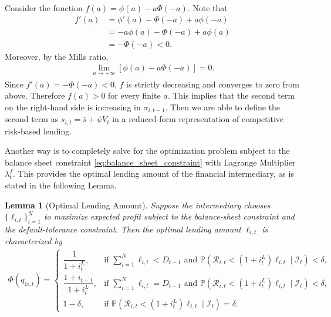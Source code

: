 \documentclass[12pt]{article}
\newtheorem{lemma}{Lemma}[section]
\numberwithin{equation}{section}
\begin{document}
\begin{appendix}
Consider the function $f(a) = \phi(a) - a\Phi(-a)$. Note that
\begin{align*}
    f'(a) &= \phi'(a) - \Phi(-a) + a\phi(-a)\\
    &= -a\phi(a) -\Phi(-a) + a\phi(a)\\
    &= -\Phi(-a) < 0.
\end{align*}
Moreover, by the Mills ratio,
\begin{align*}
    \lim_{a\to+\infty}
    \left[
    \phi(a)-a\Phi(-a)
    \right]
    =
    0.
\end{align*}
Since $f'(a)=-\Phi(-a)<0$, $f$ is strictly decreasing and converges to zero from above. Therefore $f(a)>0$ for every finite $a$. This implies that the second term on the right-hand side is increasing in $\sigma_{i,t-1}$. Then we are able to define the second term as $s_{i,t} = \bar{s} + \psi V_t$ in a reduced-form representation of competitive risk-based lending.

Another way is to completely solve for the optimization problem subject to the balance sheet constraint \eqref{eq:balance_sheet_constraint} with Lagrange Multiplier $\lambda^f_t$. This provides the optimal lending amount of the financial intermediary, as is stated in the following Lemma.
\begin{lemma}[Optimal Lending Amount]\label{lemma:optimal_lending_amount}
    Suppose the intermediary chooses $\{\ell_{i,t}\}_{i=1}^N$ to maximize expected profit subject to the balance-sheet constraint and the default-tolerance constraint. Then the optimal lending amount $\ell_{i,t}$ is characterized by
    \begin{align*}
        \Phi(q_{1i,t}) =
        \left\{
        \begin{array}{ll}
            \dfrac{1}{1+i^L_t},
            & \text{if } \sum_{i=1}^N \ell_{i,t}<D_{t-1}
            \text{ and } \mathbb{P} \left( \mathcal{R}_{i,t} < (1+i^L_{t})\ell_{i,t} \mid \mathcal{I}_t\right) < \delta, \\[1.2em]
            \dfrac{1+i_{t-1}}{1+i^L_t},
            & \text{if } \sum_{i=1}^N \ell_{i,t}=D_{t-1}
            \text{ and } \mathbb{P} \left( \mathcal{R}_{i,t} < (1+i^L_{t})\ell_{i,t} \mid \mathcal{I}_t\right) < \delta, \\[1.2em]
            1-\delta,
            & \text{if } \mathbb{P} \left( \mathcal{R}_{i,t} < (1+i^L_{t})\ell_{i,t} \mid \mathcal{I}_t\right) = \delta.
        \end{array}
        \right.
    \end{align*}
\end{lemma}


\end{appendix}
\end{document}
